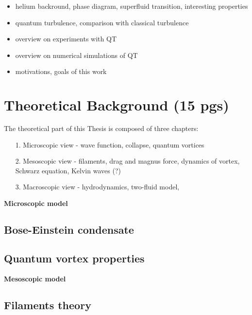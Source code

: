 \documentclass[a4paper, 12pt]{report}
\newcommand{\<}{\langle} %
\renewcommand{\>}{\rangle} %
\begin{document}
\begin{itemize}
	\item helium backround, phase diagram, superfluid transition, interesting properties
	\item quantum turbulence, comparison with classical turbulence
	\item overview on experiments with QT
	\item overview on numerical simulations of QT
	\item motivations, goals of this work
\end{itemize}

\newpage
\chapter{Theoretical Background (15 pgs)}

The theoretical part of this Thesis is composed of three chapters:

\begin{itemize}
	\item[1.] Microscopic view - wave function, collapse, quantum vortices

	\item[2.] Mesoscopic view - filaments, drag and magnus force, dynamics of vortex, Schwarz equation, Kelvin waves (?)

	\item[3.] Macroscopic view - hydrodynamics, two-fluid model, 

\end{itemize}
\vspace{1cm}

\newpage

{\Huge \bfseries Microscopic model}
\vspace{0.3cm}

\section{Bose-Einstein condensate}

\section{Quantum vortex properties}

{\Huge \bfseries Mesoscopic model}
\vspace{0.3cm}

\section{Filaments theory}
\end{document}
